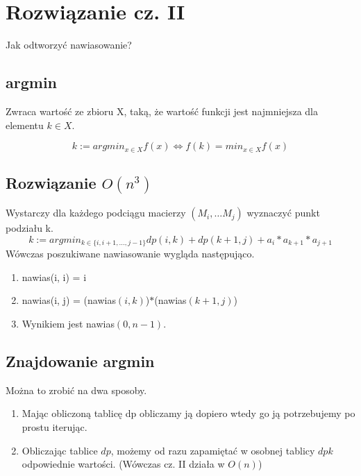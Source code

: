 \documentclass{article}
\begin{document}
\section{Rozwiązanie cz. II}
Jak odtworzyć nawiasowanie?
\subsection{argmin}
Zwraca wartość ze zbioru X, taką, że wartość funkcji jest najmniejsza dla elementu $ k \in X $.

\begin{displaymath}
	k := argmin_{x \in X} f(x) \iff f(k) = min_{x \in X}f(x)
\end{displaymath}

\subsection{Rozwiązanie $ O(n^3) $}
Wystarczy dla każdego podciągu macierzy $ (M_{i}, \dots M_{j}) $ wyznaczyć punkt podziału k.
\begin{displaymath}
k := argmin_{k \in \{ i, i + 1,  \dots, j-1 \} } dp(i, k) + dp(k + 1, j) + a_i * a_{k +1} * a_{j + 1}
\end{displaymath}
Wówczas poszukiwane nawiasowanie wygląda następująco.
\begin{enumerate}
\item nawias(i, i) = i
\item nawias(i, j) = (nawias$(i, k)$)$*$(nawias$(k+1, j)$)
\item Wynikiem jest nawias$(0, n-1)$.

\end{enumerate}

\subsection{Znajdowanie argmin}
Można to zrobić na dwa sposoby.
\begin{enumerate}
\item Mając obliczoną tablicę dp obliczamy ją dopiero wtedy go ją potrzebujemy po prostu iterując.
\item Obliczając tablice $dp$, możemy od razu zapamiętać w osobnej tablicy $ dpk$ odpowiednie wartości. (Wówczas cz. II działa w $ O(n) $)

\end{enumerate}
\end{document}
